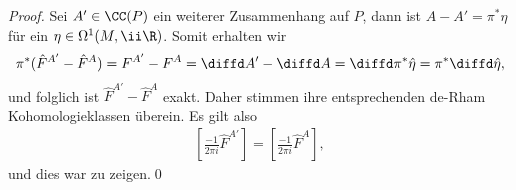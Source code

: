 \documentclass[%
	paper=a5,%
	fleqn,%
	DIV=18,%
	BCOR=0mm,
	fontsize=11pt,
	titlepage=false,%
	bibliography=totoc,
	DIV=18,%
	twoside=true,
	pdftitle=Riemannsche Geometrie,
	pdfauthor=Uwe Semmelmann,
	numbers=noendperiod]%
	{scrbook}
\begin{document}
\begin{proof}
Sei $A'\in\CC(P)$ ein weiterer Zusammenhang auf $P$, dann ist
$A-A'=\pi^*\hat{\eta}$ für ein $\eta\in\Omega^1(M,\ii\R)$. Somit erhalten wir
\begin{align*}
\pi^*(\hat F^{A'}-\hat F^A) = F^{A'}-F^A = \diffd A' - \diffd A = \diffd
\pi^*\hat{\eta} = \pi^*\diffd\hat{\eta},
\end{align*}
und folglich ist $\hat F^{A'}-\hat F^A$ exakt. Daher stimmen ihre entsprechenden de-Rham
Kohomologieklassen überein. Es gilt also
\begin{align*}
\left[\frac{-1}{2\pi i} \hat{F}^{A'}\right] = 
\left[\frac{-1}{2\pi i} \hat{F}^{A}\right],
\end{align*}
und dies war zu zeigen.\qed
\end{proof}
\end{document}
